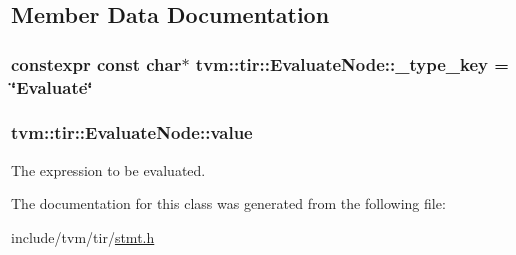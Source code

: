 \subsection{Member Data Documentation}
\subsubsection[{\texorpdfstring{\+\_\+type\+\_\+key}{_type_key}}]{\setlength{\rightskip}{0pt plus 5cm}constexpr const char$\ast$ tvm\+::tir\+::\+Evaluate\+Node\+::\+\_\+type\+\_\+key = \char`\"{}Evaluate\char`\"{}\hspace{0.3cm}{\ttfamily [static]}}\hypertarget{classtvm_1_1tir_1_1EvaluateNode_a9d2b4f296b1cfa85b64a03ca581cbea4}{}\label{classtvm_1_1tir_1_1EvaluateNode_a9d2b4f296b1cfa85b64a03ca581cbea4}
\subsubsection[{\texorpdfstring{value}{value}}]{ tvm\+::tir\+::\+Evaluate\+Node\+::value}\hypertarget{classtvm_1_1tir_1_1EvaluateNode_acd67ddcaf6ec168e993710808ec94358}{}\label{classtvm_1_1tir_1_1EvaluateNode_acd67ddcaf6ec168e993710808ec94358}


The expression to be evaluated. 



The documentation for this class was generated from the following file\+:\begin{DoxyCompactItemize}
\item 
include/tvm/tir/\hyperlink{stmt_8h}{stmt.\+h}\end{DoxyCompactItemize}
